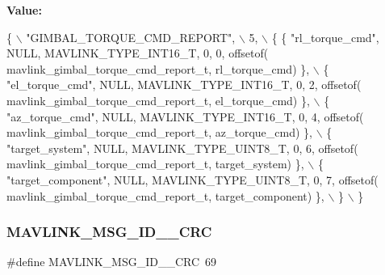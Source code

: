 {\bfseries Value\+:}
\begin{DoxyCode}
\{ \(\backslash\)
    \textcolor{stringliteral}{"GIMBAL\_TORQUE\_CMD\_REPORT"}, \(\backslash\)
    5, \(\backslash\)
    \{  \{ \textcolor{stringliteral}{"rl\_torque\_cmd"}, NULL, MAVLINK_TYPE_INT16_T, 0, 0, offsetof(
      mavlink_gimbal_torque_cmd_report_t, rl\_torque\_cmd) \}, \(\backslash\)
         \{ \textcolor{stringliteral}{"el\_torque\_cmd"}, NULL, MAVLINK_TYPE_INT16_T, 0, 2, offsetof(
      mavlink_gimbal_torque_cmd_report_t, el\_torque\_cmd) \}, \(\backslash\)
         \{ \textcolor{stringliteral}{"az\_torque\_cmd"}, NULL, MAVLINK_TYPE_INT16_T, 0, 4, offsetof(
      mavlink_gimbal_torque_cmd_report_t, az\_torque\_cmd) \}, \(\backslash\)
         \{ \textcolor{stringliteral}{"target\_system"}, NULL, MAVLINK_TYPE_UINT8_T, 0, 6, offsetof(
      mavlink_gimbal_torque_cmd_report_t, target\_system) \}, \(\backslash\)
         \{ \textcolor{stringliteral}{"target\_component"}, NULL, MAVLINK_TYPE_UINT8_T, 0, 7, offsetof(
      mavlink_gimbal_torque_cmd_report_t, target\_component) \}, \(\backslash\)
         \} \(\backslash\)
\}
\end{DoxyCode}
\mbox{\label{mavlink__msg__gimbal__torque__cmd__report_8h_a457d441c01dfea690e522680c6e1ae4c}} 
\subsubsection{M\+A\+V\+L\+I\+N\+K\+\_\+\+M\+S\+G\+\_\+\+I\+D\+\_\+\_\+\+C\+RC}
{\footnotesize\ttfamily \#define M\+A\+V\+L\+I\+N\+K\+\_\+\+M\+S\+G\+\_\+\+I\+D\+\_\+\_\+\+C\+RC~69}

\mbox{\label{mavlink__msg__gimbal__torque__cmd__report_8h_a96e0346585062395d5baef935497d5e7}} 
